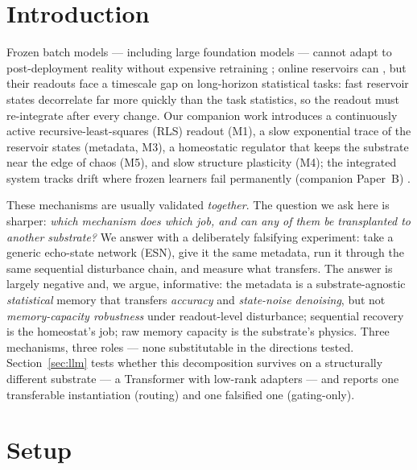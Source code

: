 \documentclass[preprint,12pt]{elsarticle}
\begin{document}
\section{Introduction}
\label{sec:intro}

Frozen batch models --- including large foundation models --- cannot adapt
to post-deployment reality without expensive retraining
\cite{parisi2019}; online reservoirs can
\cite{jaeger2001,maass2002,lukosevicius2009},
but their readouts face a timescale gap on long-horizon statistical tasks:
fast reservoir states decorrelate far more quickly than the task
statistics, so the readout must re-integrate after every change. Our
companion work introduces a continuously active recursive-least-squares
(RLS) readout (M1), a slow
exponential trace of the reservoir states (metadata, M3), a homeostatic
regulator that keeps the substrate near the edge of chaos (M5), and slow
structure plasticity (M4); the integrated
system tracks drift where frozen learners fail permanently
(companion Paper~B) \cite{companionB}.

These mechanisms are usually validated \emph{together}. The question we
ask here is sharper: \emph{which mechanism does which job, and can any of
them be transplanted to another substrate?} We answer with a deliberately
falsifying experiment: take a generic echo-state network (ESN), give it
the same metadata, run it through the same sequential disturbance chain,
and measure what transfers. The answer is largely negative and,
we argue, informative: the metadata is a substrate-agnostic
\emph{statistical} memory that transfers \emph{accuracy} and
\emph{state-noise denoising}, but not \emph{memory-capacity robustness}
under readout-level disturbance; sequential recovery is the homeostat's
job; raw memory capacity is the substrate's physics. Three mechanisms,
three roles --- none substitutable in the directions tested. Section~\ref{sec:llm} tests whether
this decomposition survives on a structurally different substrate --- a
Transformer with low-rank adapters --- and reports one transferable
instantiation (routing) and one falsified one (gating-only).

\section{Setup}
\label{sec:setup}
\end{document}
